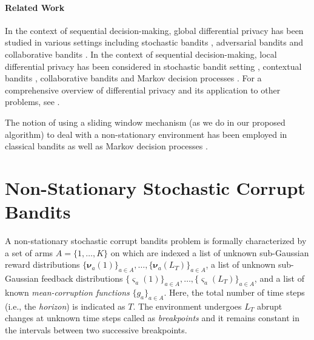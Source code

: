 \documentclass[letterpaper]{article} %
\newcommand{\numChanges}{L}
\newcommand{\RewardDist}[2]{\boldsymbol{\nu}_{#1}(#2)}
\newcommand{\FeedbackDist}[2]{\boldsymbol{\varsigma}_{#1}(#2)}
\begin{document}
\paragraph{Related Work}
In the context of sequential decision-making, global differential privacy has been studied in various settings including stochastic bandits \citep{DBLP:conf/uai/MishraT15, tossou:aaai2016}, adversarial bandits \citep{DBLP:conf/nips/ThakurtaS13, tossou:aaai2017a} and collaborative bandits \citep{10.1145/3383313.3412254}.
In the context of sequential decision-making, local differential privacy has been considered in stochastic bandit setting \citep{pmlr-v83-gajane18a, pmlr-v151-tao22a}, contextual bandits \citep{NEURIPS2020_908c9a56}, collaborative bandits \citep{10.1145/3383313.3412254} and Markov decision processes \citep{Chowdhury_Zhou_2022, DBLP:journals/corr/abs-2010-07778}.
For a comprehensive overview of differential privacy and its application to other problems, see \citet{Dwork:2014:AFD:2693052.2693053}.

The notion of using a sliding window mechanism (as we do in our proposed algorithm) to deal with a non-stationary environment has been employed in classical bandits \citep{GarivierSW} as well as Markov decision processes \citep{GajaneSW}.


\section{Non-Stationary Stochastic Corrupt Bandits}
A non-stationary stochastic corrupt bandits problem is formally characterized by a set of arms $A= \{1, \dots, K\}$ on which are indexed a list of unknown sub-Gaussian reward distributions $\{\RewardDist{a}{1} \}_{a\in A}, \dots, \{\RewardDist{a}{\numChanges_T} \}_{a\in A}$,
a list of unknown sub-Gaussian feedback distributions $\{\FeedbackDist{a}{1} \}_{a\in A}, \dots, \{\FeedbackDist{a}{\numChanges_T} \}_{a\in A}$, and a list of known \textit{mean-corruption functions} $\{g_a\}_{a\in A}$. Here, the total number of time steps (i.e., the \textit{horizon}) is indicated as $T$. The environment undergoes $\numChanges_T$ abrupt changes at unknown time steps called as \textit{breakpoints} and it remains constant in the intervals between two successive breakpoints.
\end{document}
